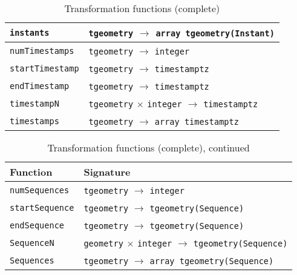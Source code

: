 \begin{table}[htbp]
\begin{subtable}{1\textwidth}
\begin{tabularx}{\textwidth}{|l|X|}
        \hline
        \lstinline+instants+            & \lstinline+tgeometry+ $\rightarrow$ \lstinline+array tgeometry(Instant)+ \\
        \hline
        \lstinline+numTimestamps+       & \lstinline+tgeometry+ $\rightarrow$ \lstinline+integer+ \\
        \hline
        \lstinline+startTimestamp+      & \lstinline+tgeometry+ $\rightarrow$ \lstinline+timestamptz+ \\
        \hline
        \lstinline+endTimestamp+        & \lstinline+tgeometry+ $\rightarrow$ \lstinline+timestamptz+ \\
        \hline
        \lstinline+timestampN+          & \lstinline+tgeometry+ $\times$ \lstinline+integer+ $\rightarrow$ \lstinline+timestamptz+ \\
        \hline
        \lstinline+timestamps+          & \lstinline+tgeometry+ $\rightarrow$ \lstinline+array timestamptz+ \\
        \hline
        \end{tabularx}
\end{subtable}
\caption{Transformation functions (complete)}
\label{table:transformation_funcs_complete}
\end{table}

\clearpage

\begin{table}[htbp]
\ContinuedFloat
\begin{subtable}{1\textwidth}
\centering
    \begin{tabularx}{\textwidth}{|l|X|}
    \hline
    \textbf{Function}   & \textbf{Signature} \\ 
    \hline
    \lstinline+numSequences+        & \lstinline+tgeometry+ $\rightarrow$ \lstinline+integer+ \\
    \hline
    \lstinline+startSequence+       & \lstinline+tgeometry+ $\rightarrow$ \lstinline+tgeometry(Sequence)+ \\
    \hline
    \lstinline+endSequence+         & \lstinline+tgeometry+ $\rightarrow$ \lstinline+tgeometry(Sequence)+ \\
    \hline
    \lstinline+SequenceN+           & \lstinline+geometry+ $\times$ \lstinline+integer+ $\rightarrow$ \lstinline+tgeometry(Sequence)+ \\
    \hline
    \lstinline+Sequences+           & \lstinline+tgeometry+ $\rightarrow$ \lstinline+array tgeometry(Sequence)+ \\
    \hline
    \end{tabularx}
\end{subtable}
\caption{Transformation functions (complete), continued}
\end{table}